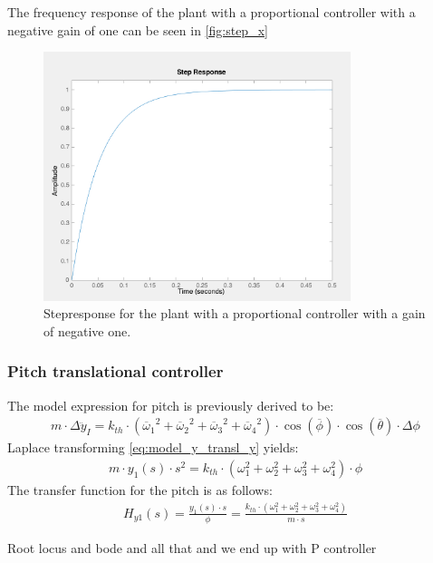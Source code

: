 The frequency response of the plant with a  proportional controller with a negative gain of one can be seen in \autoref{fig:step_x}
\begin{figure}[H]
	\centering
	\includegraphics[width=0.8\textwidth]{figures/step_x.png}
	\caption{Stepresponse for the plant with a proportional controller with a gain of negative one.}\label{fig:step_x}
\end{figure}
\subsubsection*{Pitch translational controller}
The model expression for pitch is previously derived to be:
\begin{align}
m\cdot\Delta\ddot{y}_I = k_{th}\cdot({\overline{\omega}_1}^2+{\overline{\omega}_2}^2+{\overline{\omega}_3}^2+{\overline{\omega}_4}^2)\cdot\cos(\overline{\phi})\cdot\cos(\overline{\theta})\cdot\Delta\phi
\label{eq:model_y_transl}
\end{align}
Laplace transforming \autoref{eq:model_y_transl_y} yields:
\begin{align}
m\cdot y_1(s)\cdot s^2= k_{th}\cdot (\omega_1 ^2 + \omega_2 ^2 + \omega_3 ^2 + \omega_4 ^2)\cdot \phi
\end{align}
The transfer function for the pitch is as follows:
\begin{align}
H_{y1}(s)=\frac{y_1(s)\cdot s}{\phi}=\frac{k_{th}\cdot (\omega_1 ^2 + \omega_2 ^2 + \omega_3 ^2 + \omega_4 ^2)}{m\cdot s}
\end{align}
\begin{where}
\end{where}
 
Root locus and bode and all that and we end up with P controller

